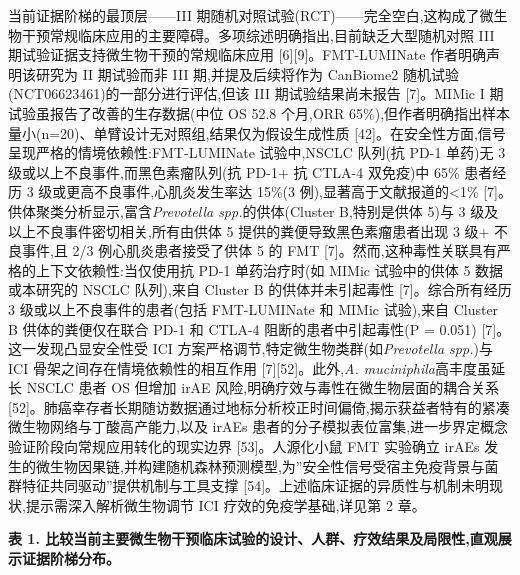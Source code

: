 当前证据阶梯的最顶层------III 期随机对照试验(RCT)------完全空白,这构成了微生物干预常规临床应用的主要障碍。多项综述明确指出,目前缺乏大型随机对照 III 期试验证据支持微生物干预的常规临床应用 {[}6{]}{[}9{]}。FMT-LUMINate 作者明确声明该研究为 II 期试验而非 III 期,并提及后续将作为 CanBiome2 随机试验(NCT06623461)的一部分进行评估,但该 III 期试验结果尚未报告 {[}7{]}。MIMic I 期试验虽报告了改善的生存数据(中位 OS 52.8 个月,ORR 65\%),但作者明确指出样本量小(n=20)、单臂设计无对照组,结果仅为假设生成性质 {[}42{]}。在安全性方面,信号呈现严格的情境依赖性:FMT-LUMINate 试验中,NSCLC 队列(抗 PD-1 单药)无 3 级或以上不良事件,而黑色素瘤队列(抗 PD-1+ 抗 CTLA-4 双免疫)中 65\% 患者经历 3 级或更高不良事件,心肌炎发生率达 15\%(3 例),显著高于文献报道的\textless1\% {[}7{]}。供体聚类分析显示,富含\emph{Prevotella spp.}的供体(Cluster B,特别是供体 5)与 3 级及以上不良事件密切相关,所有由供体 5 提供的粪便导致黑色素瘤患者出现 3 级+ 不良事件,且 2/3 例心肌炎患者接受了供体 5 的 FMT {[}7{]}。然而,这种毒性关联具有严格的上下文依赖性:当仅使用抗 PD-1 单药治疗时(如 MIMic 试验中的供体 5 数据或本研究的 NSCLC 队列),来自 Cluster B 的供体并未引起毒性 {[}7{]}。综合所有经历 3 级或以上不良事件的患者(包括 FMT-LUMINate 和 MIMic 试验),来自 Cluster B 供体的粪便仅在联合 PD-1 和 CTLA-4 阻断的患者中引起毒性(P = 0.051) {[}7{]}。这一发现凸显安全性受 ICI 方案严格调节,特定微生物类群(如\emph{Prevotella spp.})与 ICI 骨架之间存在情境依赖性的相互作用 {[}7{]}{[}52{]}。此外,\emph{A. muciniphila}高丰度虽延长 NSCLC 患者 OS 但增加 irAE 风险,明确疗效与毒性在微生物层面的耦合关系 {[}52{]}。肺癌幸存者长期随访数据通过地标分析校正时间偏倚,揭示获益者特有的紧凑微生物网络与丁酸高产能力,以及 irAEs 患者的分子模拟表位富集,进一步界定概念验证阶段向常规应用转化的现实边界 {[}53{]}。人源化小鼠 FMT 实验确立 irAEs 发生的微生物因果链,并构建随机森林预测模型,为''安全性信号受宿主免疫背景与菌群特征共同驱动''提供机制与工具支撑 {[}54{]}。上述临床证据的异质性与机制未明现状,提示需深入解析微生物调节 ICI 疗效的免疫学基础,详见第 2 章。

\textbf{表 1. 比较当前主要微生物干预临床试验的设计、人群、疗效结果及局限性,直观展示证据阶梯分布。}

